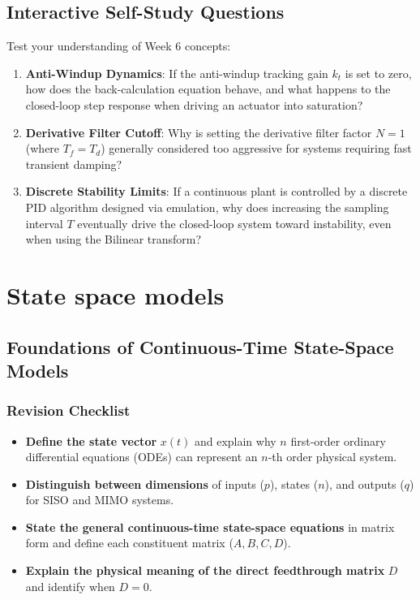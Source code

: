 \documentclass[12pt,onecolumn,twoside ]{article}
\begin{document}
	\subsection{Interactive Self-Study Questions}
	Test your understanding of Week 6 concepts:
	\begin{enumerate}
		\item
		\textbf{Anti-Windup Dynamics}: If the anti-windup tracking gain $k_t$ is set to zero, how does the back-calculation equation behave, and what happens to the closed-loop step response when driving an actuator into saturation?
		\item
		\textbf{Derivative Filter Cutoff}: Why is setting the derivative filter factor $N = 1$ (where $T_f = T_d$) generally considered too aggressive for systems requiring fast transient damping?
		\item
		\textbf{Discrete Stability Limits}: If a continuous plant is controlled by a discrete PID algorithm designed via emulation, why does increasing the sampling interval $T$ eventually drive the closed-loop system toward instability, even when using the Bilinear transform?
	\end{enumerate}
	
	\newpage
	\section{State space models}
	
	\subsection{Foundations of Continuous-Time State-Space Models}
	\subsubsection{Revision Checklist}
	\begin{itemize}
		\item[$\square$]
		\textbf{Define the state vector} $x(t)$ and explain why $n$ first-order ordinary differential equations (ODEs) can represent an $n$-th order physical system.
		\item[$\square$]
		\textbf{Distinguish between dimensions} of inputs ($p$), states ($n$), and outputs ($q$) for SISO and MIMO systems.
		\item[$\square$]
		\textbf{State the general continuous-time state-space equations} in matrix form and define each constituent matrix ($A, B, C, D$).
		\item[$\square$]
		\textbf{Explain the physical meaning of the direct feedthrough matrix} $D$ and identify when $D = 0$.
	\end{itemize}
	
\end{document}
